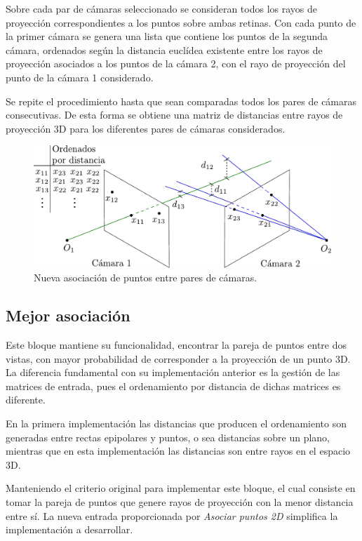 Sobre cada par de cámaras seleccionado se consideran todos los rayos de proyección correspondientes a los puntos sobre ambas retinas. Con  cada punto de la primer cámara se genera una lista que contiene los puntos de la segunda cámara, ordenados según  la distancia euclídea existente entre los rayos de proyección asociados a los puntos de la cámara 2,  con el rayo de proyección del punto de la cámara 1 considerado.

Se repite el procedimiento hasta que sean comparadas todos los pares de cámaras consecutivas. De esta forma se obtiene una matriz de distancias entre rayos de proyección 3D para los diferentes pares de cámaras considerados.

\begin{figure}[ht!]
\centering
\captionsetup{justification=centering,margin=2.8cm}
\includegraphics[scale=0.7]{img/Reconstruccion/Asociar_puntos_2}
\caption{Nueva asociación de puntos entre pares de cámaras.}
\end{figure}
 
\subsection{Mejor asociación}


Este bloque mantiene su funcionalidad, encontrar la pareja de puntos entre dos vistas, con mayor probabilidad de corresponder a la proyección de un punto 3D.
La diferencia fundamental con su implementación anterior es la gestión de las matrices de entrada, pues el ordenamiento por distancia de dichas matrices es diferente. 


En la primera implementación las distancias que producen el ordenamiento son generadas entre rectas epipolares y puntos, o sea distancias sobre un plano, mientras que en esta implementación las distancias son entre rayos en el espacio 3D.


Manteniendo el criterio original para implementar este bloque, el cual consiste en tomar la pareja de puntos que genere rayos de proyección con la menor distancia entre sí. 
La nueva entrada proporcionada por \emph{Asociar puntos 2D} simplifica la implementación a desarrollar.


